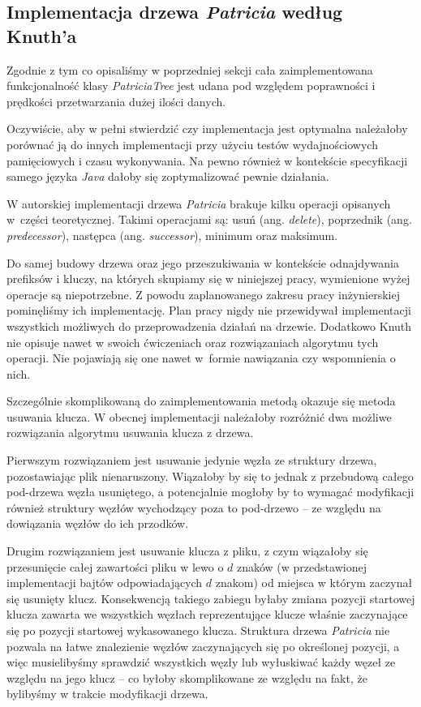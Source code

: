 		\subsection{Implementacja drzewa \emph{Patricia} według Knuth'a}\label{sec:RezultatyImplementacjiDrzewaPatriciaKnuth}
		
		Zgodnie z tym co opisaliśmy w poprzedniej sekcji cała zaimplementowana funkcjonalność klasy \emph{PatriciaTree} jest udana pod względem poprawności i prędkości przetwarzania dużej ilości danych. 
		
		Oczywiście, aby w pełni stwierdzić czy implementacja jest optymalna należałoby porównać ją do innych implementacji przy użyciu testów wydajnościowych pamięciowych i czasu wykonywania. Na pewno również w kontekście specyfikacji samego języka \emph{Java} dałoby się zoptymalizować pewnie działania.
		
		W autorskiej implementacji drzewa \emph{Patricia} brakuje kilku operacji opisanych w~części teoretycznej. Takimi operacjami są: usuń (ang. \emph{delete}), poprzednik (ang. \emph{predecessor}), następca (ang. \emph{successor}), minimum oraz maksimum. 
		
		Do samej budowy drzewa oraz jego przeszukiwania w kontekście odnajdywania prefiksów i kluczy, na których skupiamy się w niniejszej pracy, wymienione wyżej operacje są niepotrzebne. \newpage Z powodu zaplanowanego zakresu pracy inżynierskiej pominęliśmy ich implementację. Plan pracy nigdy nie przewidywał implementacji wszystkich możliwych do przeprowadzenia działań na drzewie. Dodatkowo Knuth nie opisuje nawet w swoich ćwiczeniach oraz rozwiązaniach algorytmu tych operacji. Nie pojawiają się one nawet w~formie nawiązania czy wspomnienia o nich.
		
		Szczególnie skomplikowaną do zaimplementowania metodą okazuje się metoda usuwania klucza. W obecnej implementacji należałoby rozróżnić dwa możliwe rozwiązania algorytmu usuwania klucza z drzewa. 
		
		Pierwszym rozwiązaniem jest usuwanie jedynie węzła ze struktury drzewa, pozostawiając plik nienaruszony. Wiązałoby by się to jednak z przebudową całego pod-drzewa węzła usuniętego, a potencjalnie mogłoby by to wymagać modyfikacji również struktury węzłów wychodzący poza to pod-drzewo -- ze względu na dowiązania węzłów do ich przodków.
		
		Drugim rozwiązaniem jest usuwanie klucza z pliku, z czym wiązałoby się przesunięcie całej zawartości pliku w lewo o $d$ znaków (w przedstawionej implementacji bajtów odpowiadających $d$ znakom) od miejsca w którym zaczynał się usunięty klucz. Konsekwencją takiego zabiegu byłaby zmiana pozycji startowej klucza zawarta we wszystkich węzłach reprezentujące klucze właśnie zaczynające się po pozycji startowej wykasowanego klucza. Struktura drzewa \emph{Patricia} nie pozwala na łatwe znalezienie węzłów zaczynających się po określonej pozycji, a więc musielibyśmy sprawdzić wszystkich węzły lub wyłuskiwać każdy węzeł ze względu na jego klucz -- co byłoby skomplikowane ze względu na fakt, że bylibyśmy w trakcie modyfikacji drzewa.
		
